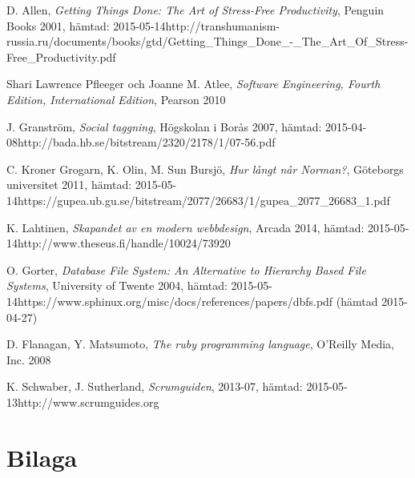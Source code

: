 \documentclass[a4paper,12pt,oneside,final]{extbook}
\begin{document}
\begin{thebibliography}{99}

  D. Allen, \emph{Getting Things Done: The Art of Stress-Free Productivity}, Penguin Books 2001, hämtad: 2015-05-14\newline http://transhumanism-russia.ru/documents/books/gtd/Getting\_Things\_Done\_-\_The\_Art\_Of\_Stress-Free\_Productivity.pdf

  Shari Lawrence Pfleeger och Joanne M. Atlee, \emph{Software Engineering, Fourth Edition, International Edition}, Pearson 2010

  J. Granström, \emph{Social taggning}, Högskolan i Borås 2007, hämtad: 2015-04-08\newline http://bada.hb.se/bitstream/2320/2178/1/07-56.pdf

  C. Kroner Grogarn, K. Olin, M. Sun Bursjö, \emph{Hur långt når Norman?}, Göteborgs universitet 2011, hämtad: 2015-05-14\newline https://gupea.ub.gu.se/bitstream/2077/26683/1/gupea\_2077\_26683\_1.pdf

  K. Lahtinen, \emph{Skapandet av en modern webbdesign}, Arcada 2014, hämtad: 2015-05-14\newline http://www.theseus.fi/handle/10024/73920

  O. Gorter, \emph{Database File System: An Alternative to Hierarchy Based File Systems}, University of Twente 2004, hämtad: 2015-05-14\newline https://www.sphinux.org/misc/docs/references/papers/dbfs.pdf (hämtad 2015-04-27)

  D. Flanagan, Y. Matsumoto, \emph{The ruby programming language}, O'Reilly Media, Inc. 2008



 K. Schwaber, J. Sutherland, \emph{Scrumguiden}, 2013-07, hämtad: 2015-05-13\newline http://www.scrumguides.org

\bibitem{}
\bibitem{}
\bibitem{}
\bibitem{}
\bibitem{}
\bibitem{}
\bibitem{}
\bibitem{}
\bibitem{}
\bibitem{}
\bibitem{}

\end{thebibliography}


\appendix

\chapter{Bilaga}
\end{document}
